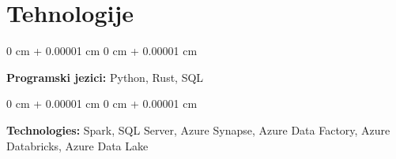 \documentclass[10pt, letterpaper]{article}
\newenvironment{onecolentry}{
    \begin{adjustwidth}{
        0 cm + 0.00001 cm
    }{
        0 cm + 0.00001 cm
    }
}{
    \end{adjustwidth}
} %
\begin{document}
    
    \section{Tehnologije}



        
        \begin{onecolentry}
            \textbf{Programski jezici:} Python, Rust, SQL
        \end{onecolentry}

        \vspace{0.2 cm}

        \begin{onecolentry}
            \textbf{Technologies:} Spark, SQL Server, Azure Synapse, Azure Data Factory, Azure Databricks, Azure Data Lake
        \end{onecolentry}

    
    
\end{document}
